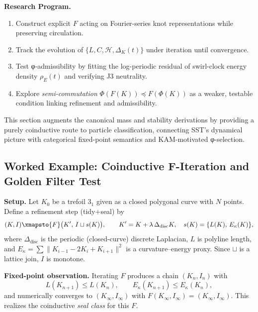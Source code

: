 \documentclass[10pt,reprint,aps,onecolumn,nofootinbib]{revtex4-2}
\begin{document}
    \noindent
    \textbf{Research Program.}
    \begin{enumerate}[label=\roman*)]
        \item Construct explicit \(F\) acting on Fourier-series knot representations while
        preserving circulation.
        \item Track the evolution of \(\{L,C,\mathcal{H},\Delta_K(t)\}\) under iteration until convergence.
        \item Test φ-admissibility by fitting the log-periodic residual of swirl-clock energy density
        \(\rho_{\!E}(t)\) and verifying J3 neutrality.
        \item Explore \emph{semi-commutation} \(\Phi(F(K)) \preceq F(\Phi(K))\) as a weaker,
        testable condition linking refinement and admissibility.
    \end{enumerate}

    \noindent
    This section augments the canonical mass and stability derivations by
    providing a purely coinductive route to particle classification,
    connecting SST’s dynamical picture with categorical fixed-point semantics
    and KAM-motivated φ-selection.


    \subsection*{Worked Example: Coinductive F-Iteration and Golden Filter Test}
        \label{subsec:coinductive-golden-example}

        \noindent
        \textbf{Setup.} Let \(K_0\) be a trefoil \(3_1\) given as a closed polygonal curve with \(N\) points.
        Define a refinement step (tidy\(+\)seal) by
        \[
            (K,I) \xmapsto{F} \bigl(K',\, I \sqcup s(K)\bigr),\qquad
            K' = K + \lambda\,\Delta_{\text{disc}}K,\quad
            s(K)=\{L(K),\,E_\kappa(K)\},
        \]
        where \(\Delta_{\text{disc}}\) is the periodic (closed-curve) discrete Laplacian,
        \(L\) is polyline length, and \(E_\kappa=\sum \lVert K_{i-1}-2K_i+K_{i+1}\rVert^2\) is a curvature–energy proxy.
        Since \(\sqcup\) is a lattice join, \(I\) is monotone.

        \medskip
        \noindent
        \textbf{Fixed-point observation.} Iterating \(F\) produces a chain \((K_n,I_n)\) with
        \[
            L(K_{n+1})\le L(K_n),\qquad E_\kappa(K_{n+1})\le E_\kappa(K_n),
        \]
        and numerically converges to \((K_\infty,I_\infty)\) with
        \(F(K_\infty,I_\infty)=(K_\infty,I_\infty)\). This realizes the coinductive
        \emph{seal class} for this \(F\).
\end{document}
